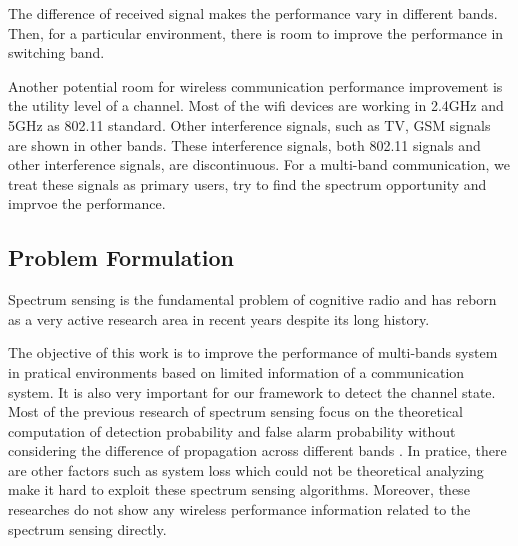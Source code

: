 The difference of received signal makes the performance vary in different bands. Then, for a particular environment, there is room to improve the performance in switching band.


Another potential room  for wireless communication performance improvement is the utility level of a channel. Most of the wifi devices are working in 2.4GHz and 5GHz as 802.11 standard. Other interference signals, such as TV, GSM signals are shown in other bands. These interference signals, both 802.11 signals and other interference signals, are discontinuous. 
For a multi-band communication, we treat these signals as primary users, try to find the spectrum opportunity and imprvoe the performance.



\subsection{Problem Formulation}
\label{subsec:problem}
Spectrum sensing is the fundamental problem of cognitive radio and has reborn as a very active research area in recent years despite its long history\cite{zeng2010review}.


The objective of this work is to improve the performance of multi-bands system in pratical environments based on limited information of a communication system.
It is also very important for our framework to detect the channel state.
Most of the previous research of spectrum sensing focus on the theoretical computation of detection probability and false alarm probability without considering the difference of propagation across different bands \cite{zeng2010review,zhao2007survey,chen2008joint,hou2011spectrum}. 
In pratice, there are other factors such as system loss which could not be theoretical analyzing make it hard to exploit these spectrum sensing algorithms.
Moreover, these researches do not show any wireless performance information related to the spectrum sensing directly. 

